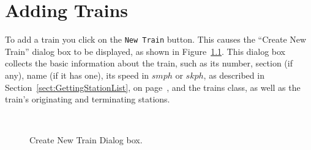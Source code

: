 
\chapter{Adding Trains}
\label{chapt:AddingTrains}

To add a train you click on the {\tt New Train} button.  This causes the
``Create New Train'' dialog box to be displayed, as shown in
Figure~\ref{fig:createNewTrainDialog}.  This dialog box collects the
basic information about the train, such as its number, section (if any),
name (if it has one), its speed in $smph$ or $skph$, as described
in Section~\ref{sect:GettingStationList}, on
page~\pageref{sect:GettingStationList}, and the trains class, as well as
the train's originating and terminating stations.

\begin{figure}
\begin{centering}
\\
\caption{Create New Train Dialog box.}
\label{fig:createNewTrainDialog}
\end{centering}
\end{figure}   

